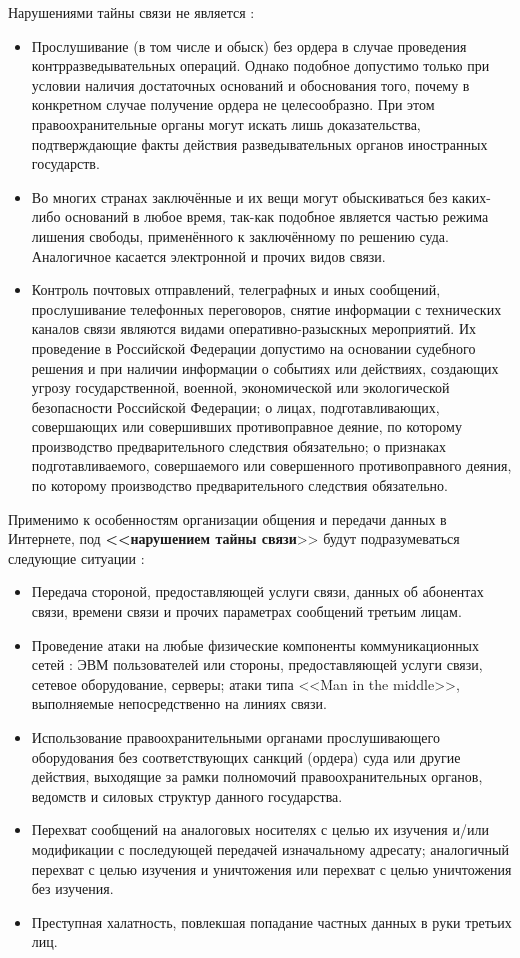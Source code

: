 Нарушениями тайны связи не является :
\begin{itemize} %
		\item Прослушивание (в том числе и обыск) без ордера   в случае проведения контрразведывательных операций. Однако подобное допустимо только при условии наличия достаточных оснований и обоснования того, почему в конкретном случае получение ордера не целесообразно. При этом правоохранительные органы могут искать лишь доказательства, подтверждающие факты действия разведывательных органов иностранных государств.
		\item Во многих странах заключённые и их вещи могут обыскиваться без каких-либо оснований в любое время, так-как подобное является частью режима лишения свободы, применённого к заключённому по решению суда. Аналогичное касается электронной и прочих видов связи.
		\item Контроль почтовых отправлений, телеграфных и иных сообщений, прослушивание телефонных переговоров, снятие информации с технических каналов связи являются видами оперативно-разыскных мероприятий. Их проведение в Российской Федерации  допустимо на основании судебного решения и при наличии информации о  событиях или действиях, создающих угрозу государственной, военной, экономической или экологической безопасности Российской Федерации; о лицах, подготавливающих, совершающих или совершивших противоправное деяние, по которому производство предварительного следствия обязательно; о признаках подготавливаемого, совершаемого или совершенного противоправного деяния, по которому производство предварительного следствия обязательно.
		
\end{itemize}

 Применимо к особенностям организации общения и передачи данных в Интернете, под   \textbf{ <<нарушением тайны связи}>> будут подразумеваться следующие ситуации : 
\begin{itemize}
	\item Передача стороной, предоставляющей услуги связи, данных об абонентах связи, времени связи и прочих параметрах сообщений третьим лицам.
	\item  Проведение атаки на любые  физические компоненты коммуникационных сетей  : ЭВМ пользователей или стороны, предоставляющей услуги связи, сетевое оборудование, серверы; атаки типа <<Man in the middle>>, выполняемые непосредственно на линиях связи.
	\item Использование правоохранительными органами прослушивающего оборудования без соответствующих санкций (ордера) суда или другие действия, выходящие за рамки полномочий правоохранительных органов, ведомств и силовых структур данного государства.
	\item Перехват сообщений на аналоговых носителях с целью их изучения и/или модификации с последующей передачей изначальному адресату; аналогичный перехват с целью изучения и уничтожения  или перехват с целью уничтожения без изучения.
	\item Преступная халатность, повлекшая попадание частных данных в руки третьих лиц.
	 
\end{itemize} 
 
\newpage %